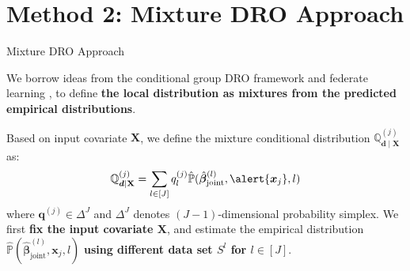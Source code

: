 \documentclass{beamer}
\newcommand{\mb}[1]{{\mathbf{#1}}}
\newcommand{\txrd}[1]{{\textcolor{sintefred}{\textbf{#1}}}}
\newcommand{\bbp}{\mathbb{P}}
\newcommand{\bbq}{\mathbb{Q}}
\begin{document}
\section{Method 2: Mixture DRO Approach}

\begin{frame}{Mixture DRO Approach}

We borrow ideas from the conditional group DRO framework and federate learning  \citep{marfoq2021federated, wang2025distributionally}, to define \txrd{the local distribution as mixtures from the predicted empirical distributions}. 

\vspace{0.3cm}
Based on input covariate $\mb X$, we define the mixture conditional distribution $\bbq^{(j)}_{\bm d \mid \mb X}$ as:
\[
\bbq^{(j)}_{\bm d \mid \mb X} = \sum_{l \in [J]} q_l^{(j)} \hat{\bbp}(\hat{\bm \beta}_{\text{joint}}^{(l)},\alert{\bm x_j}, l)
\]
where $\bm q^{(j)} \in \Delta^J$ and $\Delta^J$ denotes $(J-1)$-dimensional probability simplex.  We first \txrd{fix the input covariate $\mb X$}, and estimate the empirical distribution $\hat{\bbp}(\hat{\bm \beta}_{\text{joint}}^{(l)},\bm x_j, l)$ \txrd{using different data set $S^{l}$ for $l \in [J]$}.

\vspace{0.3cm}


\end{frame}

\end{document}
